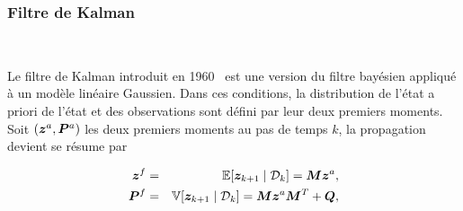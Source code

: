 




\subsubsection{Filtre de Kalman}~\label{kalman_filter}

Le filtre de Kalman introduit en 1960~\cite{kalman_new_1960} est une version du filtre bayésien appliqué à un modèle linéaire Gaussien. Dans ces conditions, la distribution de l'état a priori de l'état et des observations sont défini par leur deux premiers moments. Soit $(\bm z^a,\bm  P^a)$ les deux premiers moments au pas de temps $k$, la propagation devient se résume par

\begin{eqnarray*}
    \bm z^f &=& \mathbb{E} [\bm z_{k+1} \mid \mathcal D_k] = \bm M \bm z^a,\\
    \bm  P^f &=& \mathbb{V} [\bm z_{k+1} \mid \mathcal D_k] = \bm M \bm z^a \bm M^T + \bm Q,
\end{eqnarray*}

